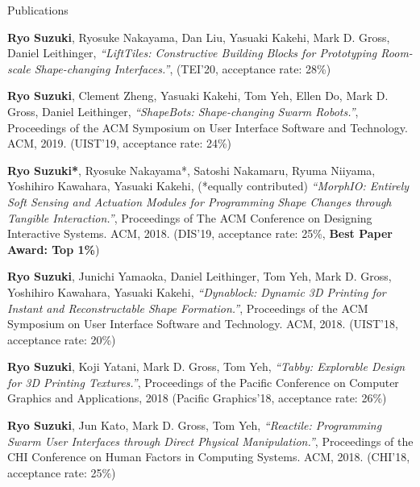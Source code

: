 \documentclass{resume} %
\begin{document}
\begin{rSection}{Publications}



{\bf Ryo Suzuki}, Ryosuke Nakayama, Dan Liu, Yasuaki Kakehi, Mark D. Gross, Daniel Leithinger,
{\it ``LiftTiles: Constructive Building Blocks for Prototyping Room-scale Shape-changing Interfaces.''},
(TEI'20, acceptance rate: 28\%)

{\bf Ryo Suzuki}, Clement Zheng, Yasuaki Kakehi, Tom Yeh, Ellen Do, Mark D. Gross, Daniel Leithinger,
{\it ``ShapeBots: Shape-changing Swarm Robots.''},
Proceedings of the ACM Symposium on User Interface Software and Technology. ACM, 2019.
(UIST'19, acceptance rate: 24\%)

{\bf Ryo Suzuki*}, Ryosuke Nakayama*, Satoshi Nakamaru, Ryuma Niiyama, Yoshihiro Kawahara, Yasuaki Kakehi, (*equally contributed)
{\it ``MorphIO: Entirely Soft Sensing and Actuation Modules for Programming Shape Changes through Tangible Interaction.''},
Proceedings of The ACM Conference on Designing Interactive Systems. ACM, 2018.
(DIS'19, acceptance rate: 25\%, {\bf Best Paper Award: Top 1\%})

{\bf Ryo Suzuki}, Junichi Yamaoka, Daniel Leithinger, Tom Yeh, Mark D. Gross, Yoshihiro Kawahara, Yasuaki Kakehi,
{\it ``Dynablock: Dynamic 3D Printing for Instant and Reconstructable Shape Formation.''},
Proceedings of the ACM Symposium on User Interface Software and Technology. ACM, 2018.
(UIST'18, acceptance rate: 20\%)

{\bf Ryo Suzuki}, Koji Yatani, Mark D. Gross, Tom Yeh,
{\it ``Tabby: Explorable Design for 3D Printing Textures.''},
Proceedings of the Pacific Conference on Computer Graphics and Applications, 2018
(Pacific Graphics'18, acceptance rate: 26\%)

{\bf Ryo Suzuki}, Jun Kato, Mark D. Gross, Tom Yeh,
{\it ``Reactile: Programming Swarm User Interfaces through Direct Physical Manipulation.''},
Proceedings of the CHI Conference on Human Factors in Computing Systems. ACM, 2018.
(CHI'18, acceptance rate: 25\%)


\end{rSection}
\end{document}
